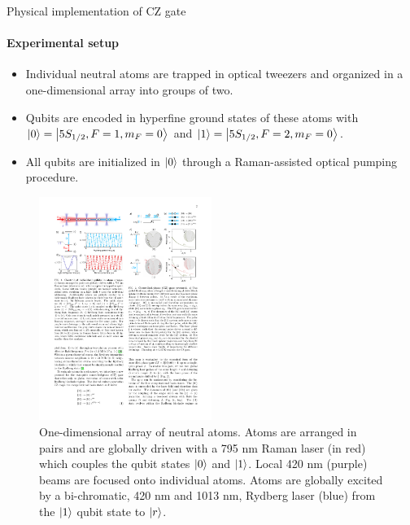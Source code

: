 \documentclass[8pt]{beamer}
\begin{document}
	\begin{frame}{Physical implementation of CZ gate}
	\framesubtitle{Experimental setup}
	
	\begin{itemize}
	    \item Individual neutral atoms are trapped in optical tweezers and organized in a one-dimensional array into groups of two.
	    \item Qubits are encoded in hyperfine ground states of these atoms with $\ket{0}=\ket{5 S_{1/2}, F=1, m_F=0 }$ and $\ket{1}=\ket{5 S_{1/2}, F=2, m_F=0 }$.
	    \item All qubits are initialized in $\ket{0}$ through a Raman-assisted optical pumping procedure.
	\end{itemize}
	
	\bigskip
	\bigskip
	
	\begin{figure}[h!]
	    \centering
	    \includegraphics[width=0.5\textwidth]{images/physical_implementation/one-dimensional-array.pdf}
	    \caption{One-dimensional array of neutral atoms. Atoms are arranged in pairs and are globally driven with a 795 nm Raman laser (in red) which couples the qubit states $\ket{0}$ and $\ket{1}$. Local 420 nm (purple) beams are focused onto individual atoms. Atoms are globally excited by a bi-chromatic, 420 nm and 1013 nm, Rydberg laser (blue) from the $\ket{1}$ qubit state to $\ket{r}$. }
	    \label{fig:one-dimensional-array}
	\end{figure}
	
	\end{frame}
	
\end{document}
